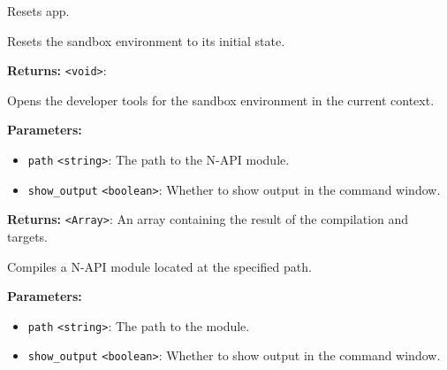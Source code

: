 \documentclass[12pt,a4paper]{article}
\begin{document}
\vspace{5mm}
\noindent {}


\noindent Resets app.

\vspace{5mm}
\noindent {}


\noindent Resets the sandbox environment to its initial state.

\vspace{5mm}
\noindent {}


\noindent \textbf{Returns:} \texttt{<void>}: 

\noindent Opens the developer tools for the sandbox environment in the current context.

\vspace{5mm}
\noindent {}


\noindent \textbf{Parameters:}
\begin{itemize}
  \item \texttt{path} \texttt{<string>}: The path to the N-API module.
  \item \texttt{show\_output} \texttt{<boolean>}: Whether to show output in the command window.
\end{itemize}

\noindent \textbf{Returns:} \texttt{<Array>}: An array containing the result of the compilation and targets.

\noindent Compiles a N-API module located at the specified path.

\vspace{5mm}
\noindent {}


\noindent \textbf{Parameters:}
\begin{itemize}
  \item \texttt{path} \texttt{<string>}: The path to the module.
  \item \texttt{show\_output} \texttt{<boolean>}: Whether to show output in the command window.
\end{itemize}
\end{document}
